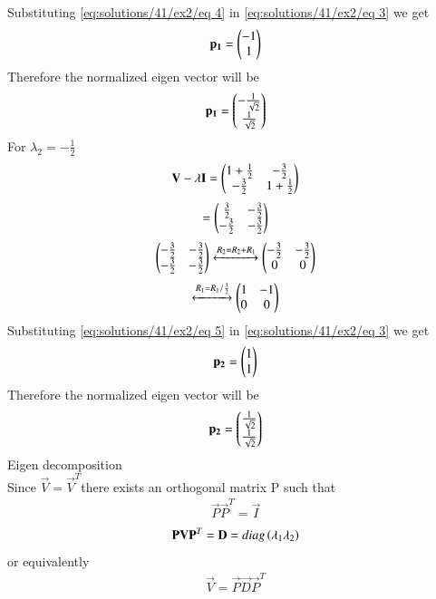Substituting \eqref{eq:solutions/41/ex2/eq 4} in \eqref{eq:solutions/41/ex2/eq 3} we get 
\begin{align}
   \mathbf{p_1}=\begin{pmatrix}-1\\1\end{pmatrix}
\end{align}
Therefore the normalized eigen vector will be
\begin{align}
    \mathbf{p_1}=\begin{pmatrix}-\frac{1}{\sqrt{2}}\\\frac{1}{\sqrt{2}}\end{pmatrix}
\end{align}
For $\lambda_2 = -\frac{1}{2} $
\begin{align}
\mathbf{V}-\lambda\mathbf{I}= \begin{pmatrix}1+\frac{1}{2}&-\frac{3}{2}\\-\frac{3}{2}&1+\frac{1}{2}\end{pmatrix}
    \end{align}
    \begin{align}
 =\begin{pmatrix}\frac{3}{2}&-\frac{3}{2}\\-\frac{3}{2}&-\frac{3}{2}\end{pmatrix}
    \end{align}
    \begin{align}
    \begin{pmatrix}-\frac{3}{2}&-\frac{3}{2}\\-\frac{3}{2}&-\frac{3}{2}\end{pmatrix}\xleftrightarrow{R_2=R_2+R_1}\begin{pmatrix}-\frac{3}{2}&-\frac{3}{2}\\ 0 &0\end{pmatrix}
\end{align}
 \begin{align}
    \xleftrightarrow{R_1=R_1/\frac{3}{2}}\begin{pmatrix}1&-1\\ 0 &0\end{pmatrix}\label{eq:solutions/41/ex2/eq 5}
   \end{align}
Substituting \eqref{eq:solutions/41/ex2/eq 5} in \eqref{eq:solutions/41/ex2/eq 3} we get 
\begin{align}
   \mathbf{p_2}=\begin{pmatrix}1\\1\end{pmatrix}
\end{align}
Therefore the normalized eigen vector will be
\begin{align}
    \mathbf{p_2}=\begin{pmatrix}\frac{1}{\sqrt{2}}\\\frac{1}{\sqrt{2}}\end{pmatrix}
\end{align}
Eigen decomposition\\ 
Since $\vec{V}=\Vec {V}^T$there exists an orthogonal matrix P such that
\begin{align}
    \vec{P}\vec{P}^T=\vec{I}
\end{align}
\begin{align}
    \mathbf{P}\mathbf{V}\mathbf{P}^T=\mathbf{D}= diag\left(\lambda_1 \lambda_2\right)
\end{align}
or equivalently
\begin{align}
    \vec{V}= \vec{P} \vec{D} \vec{P}^T
\end{align}
